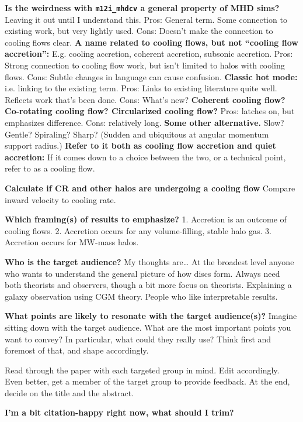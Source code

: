 \documentclass[fleqn,usenatbib]{mnras}
\begin{document}
\textbf{Is the weirdness with \texttt{m12i\_mhdcv} a general property of MHD sims?}
Leaving it out until I understand this.																																								
Pros: General term. Some connection to existing work, but very lightly used.
Cons: Doesn't make the connection to cooling flows clear.
\textbf{A name related to cooling flows, but not ``cooling flow accretion'':}
E.g. cooling accretion, coherent accretion, subsonic accretion.
Pros: Strong connection to cooling flow work, but isn't limited to halos with cooling flows.
Cons: Subtle changes in language can cause confusion.
\textbf{Classic hot mode:}
i.e. linking to the existing term.
Pros: Links to existing literature quite well. Reflects work that's been done.
Cons: What's new?
\textbf{Coherent cooling flow? Co-rotating cooling flow? Circularized cooling flow?}
Pros: latches on, but emphasizes difference.
Cons: relatively long.
\textbf{Some other alternative.}
Slow?
Gentle?
Spiraling?
Sharp? (Sudden and ubiquitous at angular momentum support radius.)
\textbf{Refer to it both as cooling flow accretion and quiet accretion:}
If it comes down to a choice between the two, or a technical point, refer to as a cooling flow.

\textbf{Calculate if CR and other halos are undergoing a cooling flow}
Compare inward velocity to cooling rate.

\textbf{
Which framing(s) of results to emphasize?
}
1. Accretion is an outcome of cooling flows.
2. Accretion occurs for any volume-filling, stable halo gas.
3. Accretion occurs for MW-mass halos.

\textbf{
Who is the target audience?
}
My thoughts are\ldots
At the broadest level anyone who wants to understand the general picture of how discs form.
Always need both theorists and observers, though a bit more focus on theorists.
Explaining a galaxy observation using CGM theory.
People who like interpretable results.

\textbf{What points are likely to resonate with the target audience(s)?}
Imagine sitting down with the target audience.
What are the most important points you want to convey?
In particular, what could they really use?
Think first and foremost of that, and shape accordingly.

Read through the paper with each targeted group in mind.
Edit accordingly.
Even better, get a member of the target group to provide feedback.
At the end, decide on the title and the abstract.

\textbf{I'm a bit citation-happy right now, what should I trim?}
\end{document}
